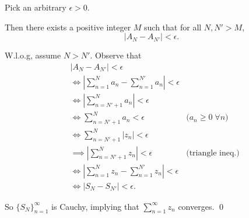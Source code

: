 \documentclass[oneside]{article}
\newcommand\abs[1]{\left|#1\right|}
\begin{document}
\begin{enumerate}[label=\textbf{(\alph*)}]
      Pick an arbitrary $\epsilon > 0$.

      Then there exists a positive integer $M$ such that for all $N, N' > M$,\[
        \abs{A_N - A_{N'}} < \epsilon\text{.}
      \]

      W.l.o.g, assume $N > N'$. Observe that \begin{align*}
        &\abs{A_N - A_{N'}} < \epsilon \\
        &\iff \abs{\sum_{n=1}^N a_n - \sum_{n=1}^{N'} a_n} < \epsilon \\
        &\iff \abs{\sum_{n=N'+1}^N a_n} < \epsilon \\
        &\iff \sum_{n=N'+1}^N a_n < \epsilon
          & \text{($a_n \geq 0 \;\forall n$)}\\
        &\iff \sum_{n=N'+1}^N \abs{z_n} < \epsilon \\
        &\implies \abs{\sum_{n=N'+1}^N z_n} < \epsilon
          & \text{(triangle ineq.)}\\
        &\iff \abs{\sum_{n=1}^N z_n - \sum_{n=1}^{N'} z_n} < \epsilon \\
        &\iff \abs{S_N - S_{N'}} < \epsilon\text{.}
      \end{align*}

      So $\{S_N\}_{n=1}^\infty$ is Cauchy, implying that $\sum_{n=1}^\infty z_n$
      converges.
      \qed

  \end{enumerate}
\end{document}
